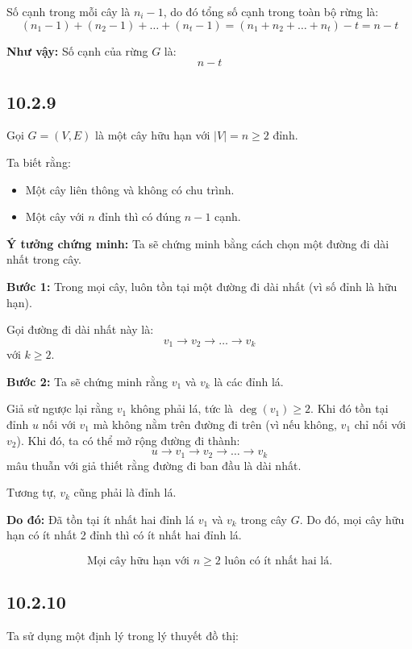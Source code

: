 \documentclass{article}
\begin{document}
	Số cạnh trong mỗi cây là $n_i - 1$, do đó tổng số cạnh trong toàn bộ rừng là:
	\[
	(n_1 - 1) + (n_2 - 1) + \dots + (n_t - 1) = (n_1 + n_2 + \dots + n_t) - t = n - t
	\]
	
	\vspace{1em}
	\noindent \textbf{Như vậy:} Số cạnh của rừng $G$ là:
	\[
	\boxed{n - t}
	\]
	
	\subsection*{10.2.9}
	Gọi $G = (V, E)$ là một cây hữu hạn với $|V| = n \geq 2$ đỉnh.
	
	Ta biết rằng:
	\begin{itemize}
		\item Một cây liên thông và không có chu trình.
		\item Một cây với $n$ đỉnh thì có đúng $n - 1$ cạnh.
	\end{itemize}
	
	\textbf{Ý tưởng chứng minh:} Ta sẽ chứng minh bằng cách chọn một đường đi dài nhất trong cây.
	
	\vspace{0.5em}
	\noindent \textbf{Bước 1:} Trong mọi cây, luôn tồn tại một đường đi dài nhất (vì số đỉnh là hữu hạn).  
	
	Gọi đường đi dài nhất này là:
	\[
	v_1 \to v_2 \to \dots \to v_k
	\]
	với $k \geq 2$.
	
	\noindent \textbf{Bước 2:} Ta sẽ chứng minh rằng $v_1$ và $v_k$ là các đỉnh lá.
	
	Giả sử ngược lại rằng $v_1$ không phải lá, tức là $\deg(v_1) \geq 2$. Khi đó tồn tại đỉnh $u$ nối với $v_1$ mà không nằm trên đường đi trên (vì nếu không, $v_1$ chỉ nối với $v_2$). Khi đó, ta có thể mở rộng đường đi thành:
	\[
	u \to v_1 \to v_2 \to \dots \to v_k
	\]
	mâu thuẫn với giả thiết rằng đường đi ban đầu là dài nhất.
	
	Tương tự, $v_k$ cũng phải là đỉnh lá.
	
	\noindent \textbf{Do đó:} Đã tồn tại ít nhất hai đỉnh lá $v_1$ và $v_k$ trong cây $G$. Do đó, mọi cây hữu hạn có ít nhất 2 đỉnh thì có ít nhất hai đỉnh lá.
	
	\[
	\boxed{\text{Mọi cây hữu hạn với } n \geq 2 \text{ luôn có ít nhất hai lá.}}
	\]
	
	\subsection*{10.2.10}
	Ta sử dụng một định lý trong lý thuyết đồ thị:
	
\end{document}
